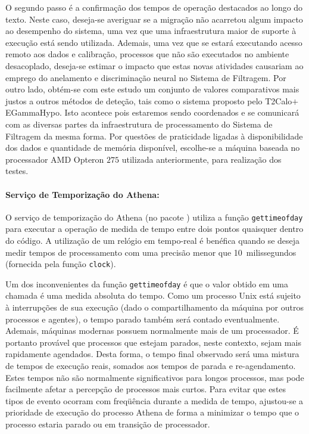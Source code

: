 O segundo passo é a confirmação dos tempos de operação destacados ao longo do
texto. Neste caso, deseja-se averiguar se a migração não acarretou algum
impacto ao desempenho do sistema, uma vez que uma infraestrutura maior de
suporte à execução está sendo utilizada. Ademais, uma vez que se estará
executando acesso remoto aos dados e calibração, processos que não são
executados no ambiente desacoplado, deseja-se estimar o impacto que estas
novas atividades causariam ao emprego do anelamento e discriminação neural no
Sistema de Filtragem. Por outro lado, obtém-se com este estudo um conjunto de
valores comparativos mais justos a outros métodos de deteção, tais como o
sistema proposto pelo T2Calo$+$EGammaHypo. Isto acontece pois estaremos sendo
coordenados e se comunicará com as diversas partes da infraestrutura de
processamento do Sistema de Filtragem da mesma forma. Por questões de
praticidade ligadas à disponibilidade dos dados e quantidade de memória
disponível, escolhe-se a máquina baseada no processador AMD Opteron $275$
utilizada anteriormente, para realização dos testes.

\paragraph{Serviço de Temporização do Athena:} O serviço de temporização do
Athena (no pacote ) utiliza a função \texttt{gettimeofday}
\cite{web:gcc-libc} para executar a operação de medida de tempo entre dois
pontos quaisquer dentro do código. A utilização de um relógio em tempo-real é
benéfica quando se deseja medir tempos de processamento com uma precisão menor
que 10~milissegundos (fornecida pela função \texttt{clock}). 

Um dos inconvenientes da função \texttt{gettimeofday} é que o valor obtido em
uma chamada é uma medida absoluta do tempo. Como um processo Unix está sujeito
à interrupções de sua execução (dado o compartilhamento da máquina por outros
processos e agentes), o tempo parado também será contado
eventualmente. Ademais, máquinas modernas possuem normalmente mais de um
processador. É portanto provável que processos que estejam parados, neste
contexto, sejam mais rapidamente agendados. Desta forma, o tempo final
observado será uma mistura de tempos de execução reais, somados aos tempos de
parada e re-agendamento. Estes tempos não são normalmente significativos para
longos processos, mas pode facilmente afetar a percepção de processos mais
curtos. Para evitar que estes tipos de evento ocorram com freqüência durante a
medida de tempo, ajustou-se a prioridade de execução do processo Athena de
forma a minimizar o tempo que o processo estaria parado ou em transição de
processador.

